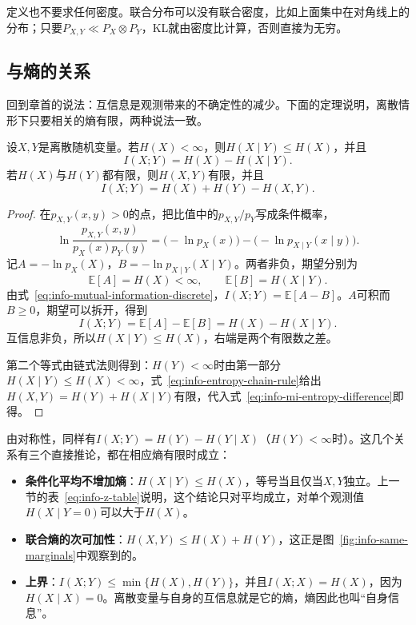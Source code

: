 定义也不要求任何密度。联合分布可以没有联合密度，比如上面集中在对角线上的分布；只要$P_{X,Y}\ll P_X\otimes P_Y$，KL就由密度比计算，否则直接为无穷。

\subsection{与熵的关系}
\label{sec:info-mi-entropy}

回到章首的说法：互信息是观测带来的不确定性的减少。下面的定理说明，离散情形下只要相关的熵有限，两种说法一致。

\begin{theorem}[互信息与熵]
\label{thm:info-mi-entropy}
设$X,Y$是离散随机变量。若$H(X)<\infty$，则$H(X\mid Y)\leq H(X)$，并且
\begin{equation}
  I(X;Y)=H(X)-H(X\mid Y).
  \label{eq:info-mi-entropy-difference}
\end{equation}
若$H(X)$与$H(Y)$都有限，则$H(X,Y)$有限，并且
\begin{equation}
  I(X;Y)=H(X)+H(Y)-H(X,Y).
  \label{eq:info-mi-entropy-sum}
\end{equation}
\end{theorem}

\begin{proof}
在$p_{X,Y}(x,y)>0$的点，把比值中的$p_{X,Y}/p_Y$写成条件概率，
\[
  \ln\frac{p_{X,Y}(x,y)}{p_X(x)p_Y(y)}=\bigl(-\ln p_X(x)\bigr)-\bigl(-\ln p_{X\mid Y}(x\mid y)\bigr).
\]
记$A=-\ln p_X(X)$，$B=-\ln p_{X\mid Y}(X\mid Y)$。两者非负，期望分别为
\[
  \mathbb{E}[A]=H(X)<\infty,\qquad\mathbb{E}[B]=H(X\mid Y).
\]由式~\eqref{eq:info-mutual-information-discrete}，$I(X;Y)=\mathbb{E}[A-B]$。$A$可积而$B\geq0$，期望可以拆开，得到
\[
  I(X;Y)=\mathbb{E}[A]-\mathbb{E}[B]=H(X)-H(X\mid Y).
\]
互信息非负，所以$H(X\mid Y)\leq H(X)$，右端是两个有限数之差。

第二个等式由链式法则得到：$H(Y)<\infty$时由第一部分$H(X\mid Y)\leq H(X)<\infty$，式~\eqref{eq:info-entropy-chain-rule}给出$H(X,Y)=H(Y)+H(X\mid Y)$有限，代入式~\eqref{eq:info-mi-entropy-difference}即得。
\end{proof}

由对称性，同样有$I(X;Y)=H(Y)-H(Y\mid X)$（$H(Y)<\infty$时）。这几个关系有三个直接推论，都在相应熵有限时成立：
\begin{itemize}
  \item \textbf{条件化平均不增加熵}：$H(X\mid Y)\leq H(X)$，等号当且仅当$X,Y$独立。上一节的表~\eqref{eq:info-z-table}说明，这个结论只对平均成立，对单个观测值$H(X\mid Y=0)$可以大于$H(X)$。
  \item \textbf{联合熵的次可加性}：$H(X,Y)\leq H(X)+H(Y)$，这正是图~\ref{fig:info-same-marginals}中观察到的。
  \item \textbf{上界}：$I(X;Y)\leq\min\{H(X),H(Y)\}$，并且$I(X;X)=H(X)$，因为$H(X\mid X)=0$。离散变量与自身的互信息就是它的熵，熵因此也叫“自身信息”。
\end{itemize}

